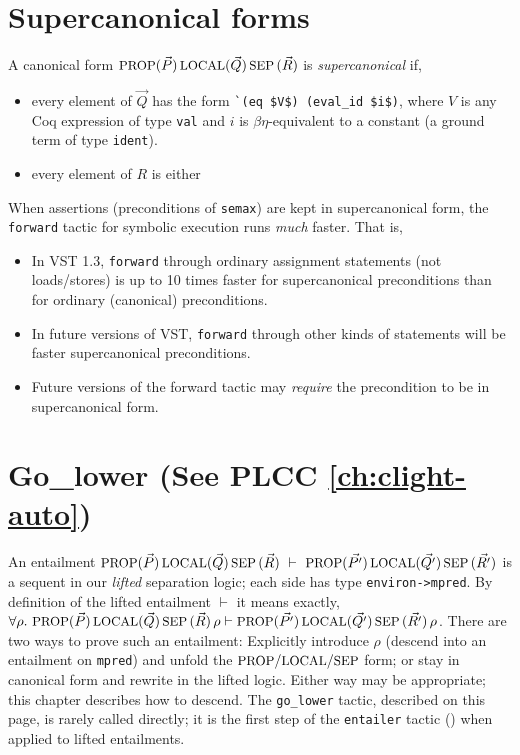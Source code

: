 \documentclass[12pt,fleqn,openany,oneside,showtrims]{memoir}
\newcommand{\ychapter}[2]{\chapter[#1]{#1 \hfill \normalsize #2}}
\begin{document}
\ychapter{Supercanonical forms}{}
\label{refcard:supercanonical}

A canonical form \(\mbox{\small PROP} (\vec{P})\,\mbox{\small LOCAL}(\vec{Q})\,\mbox{\small SEP}\,(\vec{R})\)
is \emph{supercanonical} if,
\begin{itemize}
\item every element of $\vec{Q}$ has the form
\lstinline{`(eq $V$) (eval_id $i$)}, 
where $V$ is any Coq expression of type \lstinline{val}
and $i$ is $\beta\eta$-equivalent to 
a constant (a ground term of type \lstinline{ident}).
\item every element of $R$ is either 
\end{itemize}

When assertions (preconditions of \lstinline{semax}) are kept
in supercanonical form, the \lstinline{forward} tactic
for symbolic execution runs \emph{much} faster.  That is,
\begin{itemize}
\item In VST 1.3, \lstinline{forward} through ordinary assignment statements
(not loads/stores) is up to 10 times faster for supercanonical
preconditions than for ordinary (canonical) preconditions.
\item In future versions of VST, \lstinline{forward} through other kinds of 
statements will be faster supercanonical preconditions.
\item Future versions of the forward tactic may \emph{require}
the precondition to be in supercanonical form.
\end{itemize}

\ychapter{Go\_lower}{(See PLCC \autoref{ch:clight-auto})}
\label{refcard:go-lower}
An entailment 
$\mbox{\small PROP} (\vec{P})\,\mbox{\small LOCAL}(\vec{Q})\,\mbox{\small SEP}\,(\vec{R})~
\vdash ~
\mbox{\small PROP} (\vec{P'})\,\mbox{\small LOCAL}(\vec{Q'})\,\mbox{\small SEP}\,(\vec{R'})
$
is a sequent in our \emph{lifted} separation logic;
each side
has type \lstinline{environ->mpred}.  By definition of the lifted
entailment $\vdash$ it means exactly,\linebreak
$\forall \rho.~
\mbox{\small PROP} (\vec{P})\,\mbox{\small LOCAL}(\vec{Q})\,\mbox{\small SEP}\,(\vec{R})\,\rho
\vdash 
\mbox{\small PROP} (\vec{P'})\,\mbox{\small LOCAL}(\vec{Q'})\,\mbox{\small SEP}\,(\vec{R'})\,\rho
$. \linebreak
There are two ways to prove such an entailment:
Explicitly introduce $\rho$ (descend
into an entailment on \lstinline{mpred}) and 
unfold the $\mbox{\small PROP}/\mbox{\small LOCAL}/\mbox{\small SEP}$ form; 
or stay in canonical form and rewrite in
the lifted logic.
Either way may be appropriate; this chapter describes
how to descend.
The \lstinline{go_lower} tactic, described on this page,
is rarely called directly; it is the first step of the
\lstinline{entailer} tactic ()
when applied to lifted entailments.
\end{document}
